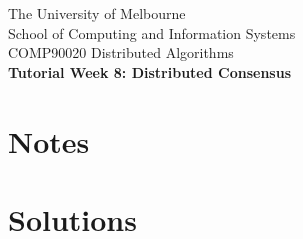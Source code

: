\documentclass[12pt]{article}
\newcounter{question}
\begin{document}
\begin{center}
    {\sc The University of Melbourne
        \\
        School of Computing and Information Systems
        \\
    COMP90020 Distributed Algorithms}
    \bigskip \\
    {\Large\bf Tutorial Week 8: Distributed Consensus}
    \bigskip \\
\end{center}

\section*{Notes}


\section*{Solutions}

\setcounter{question}{35}
\end{document}
